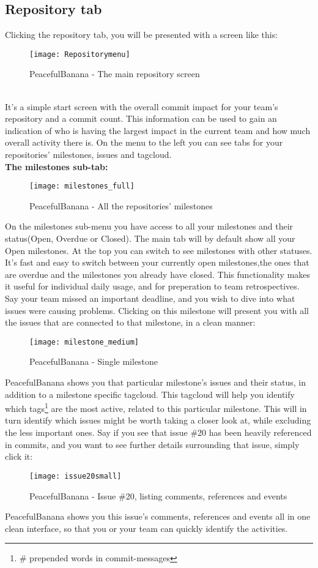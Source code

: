 \subsection{Repository tab}
Clicking the repository tab, you will be presented with a screen like this:
\begin{figure}[h!]
\label{repository}
\centering
	\texttt{[image: Repositorymenu]}
\caption{PeacefulBanana - The main repository screen}
\end{figure}
\\
It's a simple start screen with the overall commit impact for your team's repository and a commit count. This information can be used to gain an indication of who is having the largest impact in the current team and how much overall activity there is. 
On the menu to the left you can see tabs for your repositories' milestones, issues and tagcloud.
\\
\textbf{The milestones sub-tab:}
\begin{figure}[h!]
\label{milestones}
\centering
	\texttt{[image: milestones\_full]}
\caption{PeacefulBanana - All the repositories' milestones}
\end{figure}
\newpage
On the milestones sub-menu you have access to all your milestones and their status(Open, Overdue or Closed). The main tab will by default show all your Open milestones. At the top you can switch to see milestones with other statuses.\\
It's fast and easy to switch between your currently open milestones,the ones that are overdue and the milestones you already have closed. This functionality makes it useful for individual daily usage, and for preperation to team retrospectives. Say your team missed an important deadline, and you wish to dive into what issues were causing problems. Clicking on this milestone will present you with all the issues that are connected to that milestone, in a clean manner:
\begin{figure}[h!]
\label{milestonessingular}
\centering
	\texttt{[image: milestone\_medium]}
\caption{PeacefulBanana - Single milestone}
\end{figure}
PeacefulBanana shows you that particular milestone's issues and their status, in addition to a milestone specific tagcloud. This tagcloud will help you identify which tags\footnote{\# prepended words in commit-messages} are the most active, related to this particular milestone. This will in turn identify which issues might be worth taking a closer look at, while excluding the less important ones. 
Say if you see that issue \#20 has been heavily referenced in commits, and you want to see further details surrounding that issue, simply click it:
\begin{figure}[h!]
\label{milestonessingular}
\centering
	\texttt{[image: issue20small]}
\caption{PeacefulBanana - Issue \#20, listing comments, references and events}
\end{figure}
PeacefulBanana shows you this issue's comments, references and events all in one clean interface, so that you or your team can quickly identify the activities. 

